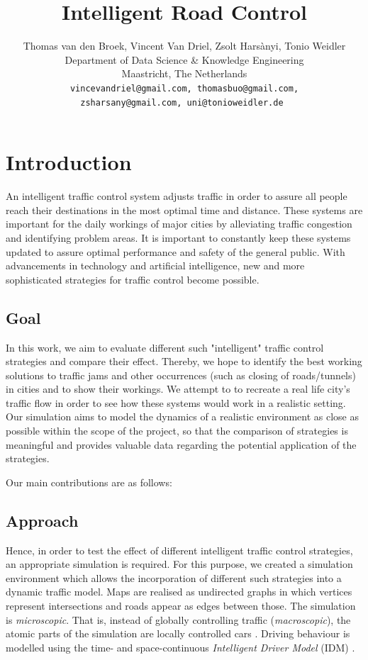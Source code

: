 \documentclass[10pt]{article}
\title{Intelligent Road Control}
\author{Thomas van den Broek, Vincent Van Driel, Zsolt Harsànyi, Tonio Weidler\\
	Department of Data Science \& Knowledge Engineering\\
	Maastricht, The Netherlands\\
	\tt \small vincevandriel@gmail.com, thomasbuo@gmail.com,\\
	\tt \small zsharsany@gmail.com, uni@tonioweidler.de
}
\begin{document}
\maketitle

\section{Introduction}
An intelligent traffic control system adjusts traffic in order to assure all people reach their destinations in the most optimal time and distance. These systems are important for the daily workings of major cities by alleviating traffic congestion and identifying problem areas.  It is important to constantly keep these systems updated to assure optimal performance and safety of the general public. With advancements in technology and artificial intelligence, new and more sophisticated strategies for traffic control become possible.

\subsection{Goal}
In this work, we aim to evaluate different such "intelligent" traffic control strategies and compare their effect. Thereby, we hope to identify the best working solutions to traffic jams and other occurrences (such as closing of roads/tunnels) in cities and to show their workings. We attempt to to recreate a real life city's traffic flow in order to see how these systems would work in a realistic setting. Our simulation aims to model the dynamics of a realistic environment as close as possible within the scope of the project, so that the comparison of strategies is meaningful and provides valuable data regarding the potential application of the strategies.

Our main contributions are as follows:


\subsection{Approach}
Hence, in order to test the effect of different intelligent traffic control strategies, an appropriate simulation is required. For this purpose, we created a simulation environment which allows the incorporation of different such strategies into a dynamic traffic model. Maps are realised as undirected graphs in which vertices represent intersections and roads appear as edges between those. The simulation is \textit{microscopic}. That is, instead of globally controlling traffic (\textit{macroscopic}), the atomic parts of the simulation are locally controlled cars \citep[see also][]{krajzewicz2002sumo}. Driving behaviour is modelled using the time- and space-continuous \textit{Intelligent Driver Model} (IDM) \citep{treiber2000congested}. 
\end{document}

